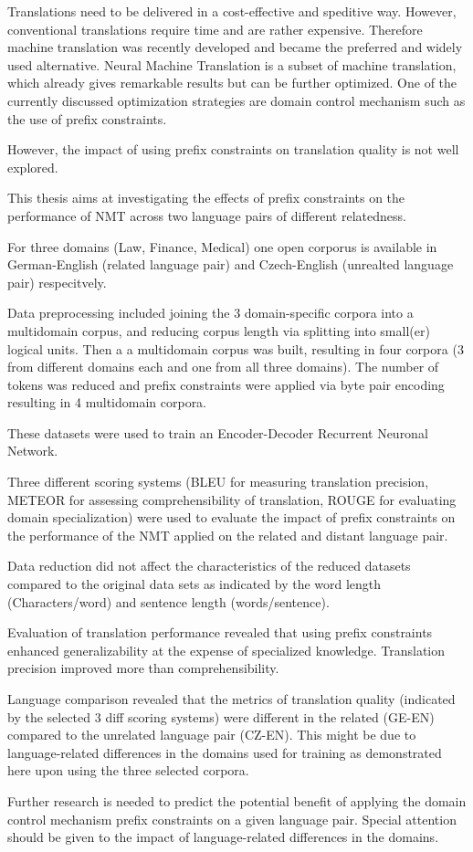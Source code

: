 Translations need to be delivered in a cost-effective and speditive way.
However, conventional translations require time and are rather expensive.
Therefore machine translation was recently developed and became the preferred and widely used alternative. 
Neural Machine Translation is a subset of machine translation, which already gives remarkable results but can be further optimized. One of the currently discussed optimization strategies are domain control mechanism such as the use of prefix constraints. 

However, the impact of using prefix constraints on translation quality is not well explored. 

This thesis aims at investigating the effects of prefix constraints on the performance of NMT across two language pairs of different relatedness. 

For three domains (Law, Finance, Medical) one open corporus is available in German-English (related language pair) and Czech-English (unrealted language pair) respecitvely. 

Data preprocessing included joining the 3 domain-specific corpora into a multidomain corpus, and reducing corpus length via splitting  into small(er) logical units. Then a a multidomain corpus was built, resulting in four corpora (3 from different domains each and one from all three domains). The number of tokens was reduced and prefix constraints were applied via byte pair encoding resulting in 4 multidomain corpora. 

These datasets were used to train an Encoder-Decoder Recurrent Neuronal Network.

Three different scoring systems  (BLEU for measuring translation precision, METEOR for assessing comprehensibility of translation, ROUGE for evaluating domain specialization) were used to evaluate the impact of prefix constraints on the performance of the NMT applied on the related and distant language pair. 

Data reduction did not affect the characteristics of the reduced datasets compared to the original data sets as indicated by the word length (Characters/word) and sentence length (words/sentence).

Evaluation of translation performance revealed that using prefix constraints enhanced generalizability at the expense of specialized knowledge. Translation precision improved more than comprehensibility.

Language comparison revealed that the metrics of translation quality (indicated by the selected 3 diff scoring systems) were different in the related (GE-EN) compared to the unrelated language pair (CZ-EN).
This might be due to  language-related differences in the domains used for training as demonstrated here upon using the three selected corpora. 

Further research is needed to predict the potential benefit of applying the domain control mechanism prefix constraints on a given language pair.
Special attention should be given to the impact of language-related differences in the domains.
